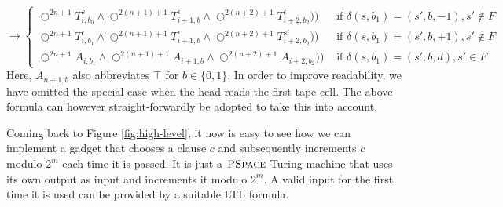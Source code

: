 \documentclass{llncs}
\newcommand{\pspace}{\textsc{PSpace} }
\begin{document}
\begin{equation*}
  \rightarrow \left\{
    \begin{array}{ll}
      \bigcirc^{2n+1} T_{i,b_0}^{s'} \wedge \bigcirc^{2(n+1)+1}
      T_{i+1,b}^\epsilon \wedge \bigcirc^{2(n+2)+1} T_{i+2,b_2}^\epsilon))& \text{ if }
      \delta(s,b_1)=(s',b,-1), s'\not\in F\\
      \bigcirc^{2n+1} T_{i,b_1}^\epsilon \wedge \bigcirc^{2(n+1)+1}
      T_{i+1,b}^\epsilon \wedge \bigcirc^{2(n+2)+1} T_{i+2,b_2}^{s'}))& \text{ if }
      \delta(s,b_1)=(s',b,+1),s'\not\in F\\
      \bigcirc^{2n+1} A_{i,b_1} \wedge \bigcirc^{2(n+1)+1}
      A_{i+1,b} \wedge \bigcirc^{2(n+2)+1} A_{i+2,b_2}))& \text{ if }
      \delta(s,b_1)=(s',b,d), s'\in F
    \end{array}
    \right.
\end{equation*}
Here, $A_{n+1,b}$ also abbreviates $\top$ for $b\in\{0,1\}$. In order
to improve readability, we have omitted the special case when the head
reads the first tape cell. The above formula can however
straight-forwardly be adopted to take this into account.

Coming back to Figure \ref{fig:high-level}, it now is easy to see how
we can implement a gadget that chooses a clause $c$ and subsequently
increments $c$ modulo $2^m$ each time it is passed. It is just a
$\pspace$ Turing machine that uses its own output as input and
increments it modulo $2^m$. A valid input for the first time it is
used can be provided by a suitable LTL formula.
\end{document}
